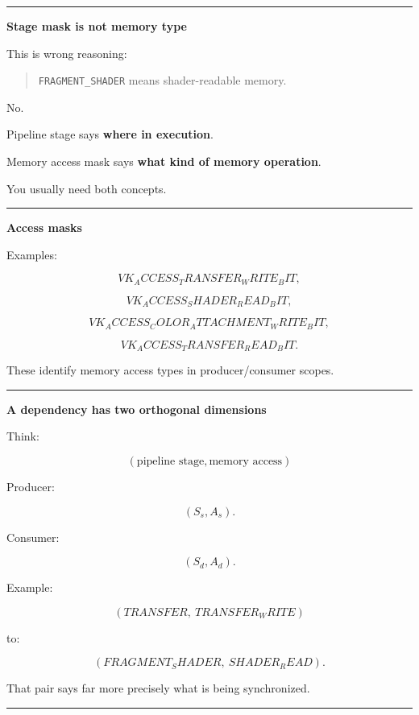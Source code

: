 \begin{center}\rule{0.5\linewidth}{0.5pt}\end{center}

\textbf{Stage mask is not memory type}

This is wrong reasoning:

\begin{quote}
\texttt{FRAGMENT\_SHADER} means shader-readable memory.
\end{quote}

No.

Pipeline stage says \textbf{where in execution}.

Memory access mask says \textbf{what kind of memory operation}.

You usually need both concepts.

\begin{center}\rule{0.5\linewidth}{0.5pt}\end{center}

\textbf{Access masks}

Examples:

\[
VK_ACCESS_TRANSFER_WRITE_BIT,
\]

\[
VK_ACCESS_SHADER_READ_BIT,
\]

\[
VK_ACCESS_COLOR_ATTACHMENT_WRITE_BIT,
\]

\[
VK_ACCESS_TRANSFER_READ_BIT.
\]

These identify memory access types in producer/consumer scopes.

\begin{center}\rule{0.5\linewidth}{0.5pt}\end{center}

\textbf{A dependency has two orthogonal dimensions}

Think:

\[
\boxed{
(\text{pipeline stage},\text{memory access})
}
\]

Producer:

\[
(S_s,A_s).
\]

Consumer:

\[
(S_d,A_d).
\]

Example:

\[
(TRANSFER,\ TRANSFER_WRITE)
\]

to:

\[
(FRAGMENT_SHADER,\ SHADER_READ).
\]

That pair says far more precisely what is being synchronized.

\begin{center}\rule{0.5\linewidth}{0.5pt}\end{center}

